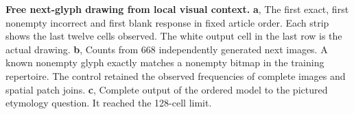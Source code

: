 \textbf{Free next-glyph drawing from local visual context.}
\textbf{a}, The first exact, first nonempty incorrect and first blank
response in fixed article order. Each strip shows the last twelve cells
observed. The white output cell in the last row is the actual drawing.
\textbf{b}, Counts from 668 independently generated next images. A known
nonempty glyph exactly matches a nonempty bitmap in the training repertoire.
The control retained the observed frequencies of complete images and spatial
patch joins. \textbf{c}, Complete output of the ordered model to the
pictured etymology question. It reached the 128-cell limit.
